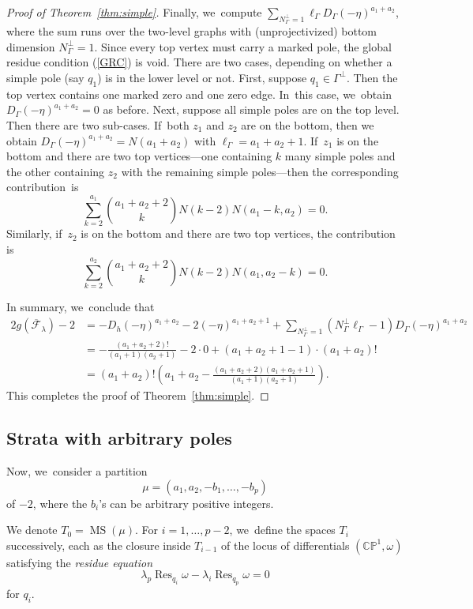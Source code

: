 \documentclass[11pt]{article}
\DeclareMathOperator\MS{MS}
\DeclareMathOperator\Res{Res}
\theoremstyle{definition}
\begin{document}
\begin{proof}[Proof of Theorem~\ref{thm:simple}]
Finally, we~compute $\sum_{N_\Gamma^{\bot} = 1} \ell_\Gamma D_\Gamma (-\eta)^{a_1+a_2}$, where the sum runs over the two-level graphs with (unprojectivized) bottom dimension $N_\Gamma^{\bot} = 1$. Since every top vertex must carry a marked pole, the global residue condition (\ref{GRC}) is void. There are two cases, depending on whether a simple pole (say $q_1$) is in the lower level or not. First, suppose $q_1\in \Gamma^\bot$. Then the top vertex contains one marked zero and one zero edge. In~this case, we~obtain $D_\Gamma (-\eta)^{a_1+a_2} = 0$ as before. Next, suppose all simple poles are on the top level. Then there are two sub-cases. If~both $z_1$ and $z_2$ are on the bottom, then we obtain
$D_\Gamma (-\eta)^{a_1+a_2} = N(a_1+a_2)$ with $\ell_\Gamma = a_1+a_2+1$. If~$z_1$ is on the bottom and there are two top vertices---one containing $k$ many simple poles and the other containing $z_2$ with the remaining simple poles---then the corresponding contribution~is
\[
\sum_{k=2}^{a_1} \binom{a_1+a_2+2}{k} N(k-2) N(a_1-k, a_2) = 0.
\]
Similarly, if~$z_2$ is on the bottom and there are two top vertices, the contribution is
\[
\sum_{k=2}^{a_2} \binom{a_1+a_2+2}{k} N(k-2) N(a_1, a_2-k) = 0.
\]

In summary, we~conclude that
\begin{align*}
2g (\overline{\mathcal F}_\lambda) -2 & = - D_h (-\eta)^{a_1+a_2} - 2 (-\eta)^{a_1+a_2+1} +
\sum_{N_\Gamma^{\bot} = 1} (N_\Gamma^{\bot}\ell_\Gamma - 1) D_\Gamma (-\eta)^{a_1+a_2} \\
& = - \frac{(a_1+a_2+2)!}{(a_1+1)(a_2+1)} - 2\cdot 0 + (a_1+a_2+1-1) \cdot (a_1+a_2)! \\
& = (a_1+a_2)! \left( a_1+a_2 - \frac{(a_1+a_2+2)(a_1+a_2+1)}{(a_1+1)(a_2+1)} \right).
\end{align*}
This completes the proof of Theorem~\ref{thm:simple}.
\end{proof}

\subsection{Strata with arbitrary poles}

Now, we~consider a partition
\[
\mu = (a_1, a_2, -b_1, \ldots, -b_p)
\]
of $-2$, where the $b_i$'s can be arbitrary positive integers.

We denote $T_0= \MS(\mu)$. For $i=1,\ldots,p-2$, we~define the spaces $T_i$ successively, each as the closure inside $T_{i-1}$ of the locus of differentials $(\mathbb{C}\mathbb{P}^1,\omega)$ satisfying the {\em residue equation}
\[
\lambda_{p} \Res_{q_i}\omega-\lambda_{i} \Res_{q_p}\omega=0
\]
for $q_i$.
\end{document}
